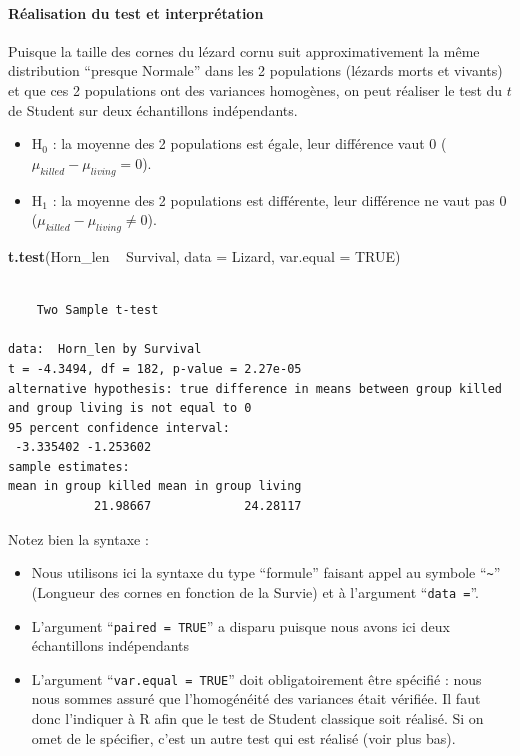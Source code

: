 \documentclass[
  a4paper,
]{article}
\newenvironment{Shaded}{\begin{snugshade}}{\end{snugshade}}
\newcommand{\DataTypeTok}[1]{\textcolor[rgb]{0.00,0.34,0.68}{#1}}
\newcommand{\KeywordTok}[1]{\textcolor[rgb]{0.12,0.11,0.11}{\textbf{#1}}}
\newcommand{\NormalTok}[1]{\textcolor[rgb]{0.12,0.11,0.11}{#1}}
\newcommand{\OperatorTok}[1]{\textcolor[rgb]{0.12,0.11,0.11}{#1}}
\newcommand{\OtherTok}[1]{\textcolor[rgb]{0.00,0.43,0.16}{#1}}
\newcommand{\StringTok}[1]{\textcolor[rgb]{0.75,0.01,0.01}{#1}}
\providecommand{\tightlist}{%
  \setlength{\itemsep}{0pt}\setlength{\parskip}{0pt}}
\begin{document}
\hypertarget{ruxe9alisation-du-test-et-interpruxe9tation-2}{%
\paragraph{Réalisation du test et interprétation}\label{ruxe9alisation-du-test-et-interpruxe9tation-2}}

Puisque la taille des cornes du lézard cornu suit approximativement la même distribution ``presque Normale'' dans les 2 populations (lézards morts et vivants) et que ces 2 populations ont des variances homogènes, on peut réaliser le test du \(t\) de Student sur deux échantillons indépendants.

\begin{itemize}
\tightlist
\item
  H\(_0\) : la moyenne des 2 populations est égale, leur différence vaut 0 (\(\mu_{killed}-\mu_{living} = 0\)).
\item
  H\(_1\) : la moyenne des 2 populations est différente, leur différence ne vaut pas 0 (\(\mu_{killed}-\mu_{living} \neq 0\)).
\end{itemize}

\begin{Shaded}
\begin{Highlighting}[]
\KeywordTok{t.test}\NormalTok{(Horn_len }\OperatorTok{~}\StringTok{ }\NormalTok{Survival, }\DataTypeTok{data =}\NormalTok{ Lizard, }\DataTypeTok{var.equal =} \OtherTok{TRUE}\NormalTok{)}
\end{Highlighting}
\end{Shaded}

\begin{verbatim}

    Two Sample t-test

data:  Horn_len by Survival
t = -4.3494, df = 182, p-value = 2.27e-05
alternative hypothesis: true difference in means between group killed and group living is not equal to 0
95 percent confidence interval:
 -3.335402 -1.253602
sample estimates:
mean in group killed mean in group living 
            21.98667             24.28117 
\end{verbatim}

Notez bien la syntaxe :

\begin{itemize}
\tightlist
\item
  Nous utilisons ici la syntaxe du type ``formule'' faisant appel au symbole ``\texttt{\textasciitilde{}}'' (Longueur des cornes en fonction de la Survie) et à l'argument ``\texttt{data\ =}''.
\item
  L'argument ``\texttt{paired\ =\ TRUE}'' a disparu puisque nous avons ici deux échantillons indépendants
\item
  L'argument ``\texttt{var.equal\ =\ TRUE}'' doit obligatoirement être spécifié : nous nous sommes assuré que l'homogénéité des variances était vérifiée. Il faut donc l'indiquer à R afin que le test de Student classique soit réalisé. Si on omet de le spécifier, c'est un autre test qui est réalisé (voir plus bas).
\end{itemize}
\end{document}
